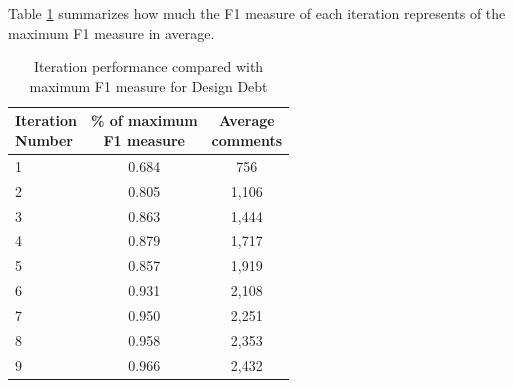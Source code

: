 %

Table \ref{tbl:design_iteration_performance} summarizes how much the F1 measure of each iteration represents of the maximum F1 measure in average.  
\begin{table}[!hbt]
    \begin{center}
        \caption{Iteration performance compared with maximum F1 measure for Design Debt}
        \label{tbl:design_iteration_performance}
        \begin{tabular}{l| c c }
        \toprule
        \thead{Iteration\\Number} & \thead{\% of maximum\\F1 measure} & \thead{Average\\comments} \\
        \midrule
         1  &  0.684  & 756 \\  
         2  &  0.805  & 1,106 \\  
         3  &  0.863  & 1,444 \\  
         4  &  0.879  & 1,717 \\  
         5  &  0.857  & 1,919 \\  
         6  &  0.931  & 2,108 \\  
         7  &  0.950  & 2,251 \\  
         8  &  0.958  & 2,353 \\  
         9  &  0.966  & 2,432 \\  
        \bottomrule
        \end{tabular}
    \end{center}    
\end{table}

\conclusionbox{}